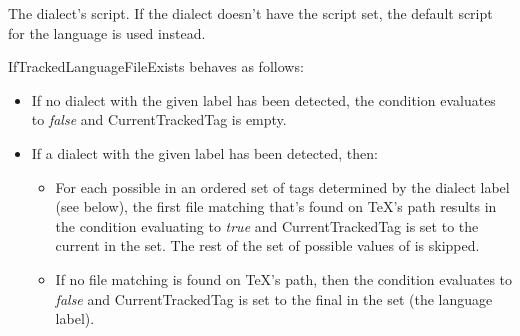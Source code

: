\documentclass[titlepage=false,oneside,
 fontsize=12pt,captions=tableheading]{scrbook}
\begin{document}
The dialect's script. If the dialect doesn't have the script set,
the default script for the language is used instead.

\gls{IfTrackedLanguageFileExists} behaves as follows:
\begin{itemize}
 \item If no dialect with the given label has been
  detected, the condition evaluates to \emph{false} and
 \gls{CurrentTrackedTag} is empty.

 \item If a dialect with the given label has been detected, then:
 \begin{itemize}
 \item For each possible  in an ordered set of tags determined by
   the dialect label (see below), the first file matching
    that's found on
   \TeX's path results in the condition evaluating to \emph{true} and
   \gls{CurrentTrackedTag} is set to the current  in the
   set. The rest of the set of possible values of  is skipped.

 \item If no file matching  is
   found on \TeX's path, then the condition evaluates to \emph{false}
   and \gls{CurrentTrackedTag} is set to the final  in the
   set (the language label).
 \end{itemize}
\end{itemize}
\end{document}
